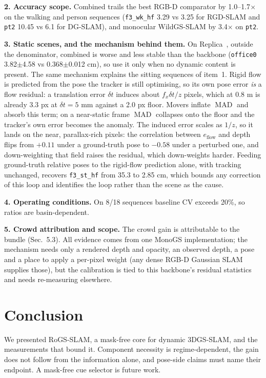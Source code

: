 \textbf{2. Accuracy scope.} Combined trails the best RGB-D comparator by 1.0--1.7$\times$ on the walking and person sequences (\texttt{f3\_wk\_hf} 3.29 vs 3.25 for RGD-SLAM and \texttt{pt2} 10.45 vs 6.1 for DG-SLAM), and monocular WildGS-SLAM by 3.4$\times$ on \texttt{pt2}.


\textbf{3. Static scenes, and the mechanism behind them.} On Replica~\cite{replica}, outside the denominator, combined is worse and less stable than the backbone (\texttt{office0} 3.82$\pm$4.58 vs 0.368$\pm$0.012 cm), so use it only when no dynamic content is present. The same mechanism explains the sitting sequences of item~1. Rigid flow is predicted from the pose the tracker is still optimising, so its own pose error \emph{is} a flow residual: a translation error $\delta t$ induces about $f_x\delta t/z$ pixels, which at 0.8 m is already 3.3 px at $\delta t = 5$ mm against a 2.0 px floor. Movers inflate $\operatorname{MAD}$ and absorb this term; on a near-static frame $\operatorname{MAD}$ collapses onto the floor and the tracker's own error becomes the anomaly. The induced error scales as $1/z$, so it lands on the near, parallax-rich pixels: the correlation between $e_{\text{flow}}$ and depth flips from $+0.11$ under a ground-truth pose to $-0.58$ under a perturbed one, and down-weighting that field raises the residual, which down-weights harder. Feeding ground-truth relative poses to the rigid-flow prediction alone, with tracking unchanged, recovers \texttt{f3\_st\_hf} from 35.3 to 2.85 cm, which bounds any correction of this loop and identifies the loop rather than the scene as the cause.


\textbf{4. Operating conditions.} On 8/18 sequences baseline CV exceeds 20\%, so ratios are basin-dependent.


\textbf{5. Crowd attribution and scope.} The crowd gain is attributable to the bundle (Sec.~5.3). All evidence comes from one MonoGS implementation; the mechanism needs only a rendered depth and opacity, an observed depth, a pose and a place to apply a per-pixel weight (any dense RGB-D Gaussian SLAM supplies those), but the calibration is tied to this backbone's residual statistics and needs re-measuring elsewhere.




\section{Conclusion}
\enlargethispage{3\baselineskip}


We presented RoGS-SLAM, a mask-free core for dynamic 3DGS-SLAM, and the measurements that bound it. Component necessity is regime-dependent, the gain does not follow from the information alone, and pose-side claims must name their endpoint. A mask-free cue selector is future work.



